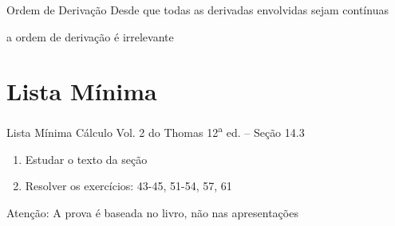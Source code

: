 \begin{frame}{Ordem de Derivação}
  Desde que todas as derivadas envolvidas sejam contínuas

  \pause
  a ordem de derivação é irrelevante
\end{frame}



\section{Lista Mínima}

\begin{frame}{Lista Mínima}
  Cálculo Vol. 2 do Thomas 12\textsuperscript{a} ed. -- Seção 14.3
  \begin{enumerate}
    \item Estudar o texto da seção
    \item Resolver os exercícios: 43-45, 51-54, 57, 61
  \end{enumerate}

  \vfill
  Atenção: A prova é baseada no livro, não nas apresentações
\end{frame}


